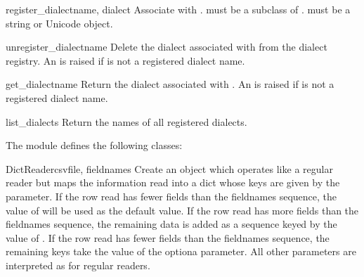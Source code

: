 \begin{funcdesc}{register_dialect}{name, dialect}
Associate  with .   must be a subclass
of .   must be a string or Unicode object.
\end{funcdesc}

\begin{funcdesc}{unregister_dialect}{name}
Delete the dialect associated with  from the dialect registry.  An
 is raised if  is not a registered dialect
name.
\end{funcdesc}

\begin{funcdesc}{get_dialect}{name}
Return the dialect associated with .  An  is
raised if  is not a registered dialect name.
\end{funcdesc}

\begin{funcdesc}{list_dialects}{}
Return the names of all registered dialects.
\end{funcdesc}


The  module defines the following classes:

\begin{classdesc}{DictReader}{csvfile, fieldnames}
Create an object which operates like a regular reader but maps the
information read into a dict whose keys are given by the 
parameter.  If the row read has fewer fields than the fieldnames sequence,
the value of  will be used as the default value.  If the row
read has more fields than the fieldnames sequence, the remaining data is
added as a sequence keyed by the value of .  If the row read
has fewer fields than the fieldnames sequence, the remaining keys take the
value of the optiona  parameter.  All other parameters are
interpreted as for regular readers.
\end{classdesc}


